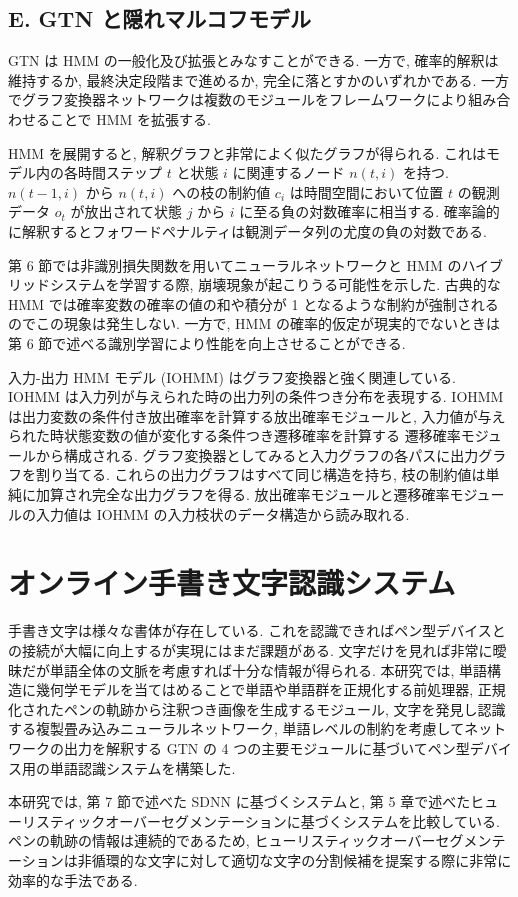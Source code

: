 \documentclass[twocolumn]{jarticle}     %
\begin{document}
\subsection*{E. GTN と隠れマルコフモデル}
GTN は HMM の一般化及び拡張とみなすことができる. 一方で, 確率的解釈は
維持するか, 最終決定段階まで進めるか, 完全に落とすかのいずれかである. 
一方でグラフ変換器ネットワークは複数のモジュールをフレームワークにより組み合わせることで HMM を拡張する.
\par
HMM を展開すると, 解釈グラフと非常によく似たグラフが得られる. これはモデル内の各時間ステップ $t$ と状態 $i$ に関連するノード $n(t,i)$ を持つ.  $n(t-1, i)$ から $n(t, i)$ への枝の制約値 $c_i$ は時間空間において位置 $t$ の観測データ $o_t$ が放出されて状態 $j$ から $i$ に至る負の対数確率に相当する. 確率論的に解釈するとフォワードペナルティは観測データ列の尤度の負の対数である. 
\par
第 6 節では非識別損失関数を用いてニューラルネットワークと HMM のハイブリッドシステムを学習する際, 崩壊現象が起こりうる可能性を示した. 
古典的な HMM では確率変数の確率の値の和や積分が 1 となるような制約が強制されるのでこの現象は発生しない. 
一方で, HMM の確率的仮定が現実的でないときは第 6 節で述べる識別学習により性能を向上させることができる. 
\par
入力-出力 HMM モデル (IOHMM) はグラフ変換器と強く関連している. IOHMM は入力列が与えられた時の出力列の条件つき分布を表現する. 
IOHMM は出力変数の条件付き放出確率を計算する放出確率モジュールと, 入力値が与えられた時状態変数の値が変化する条件つき遷移確率を計算する
遷移確率モジュールから構成される. グラフ変換器としてみると入力グラフの各パスに出力グラフを割り当てる. これらの出力グラフはすべて同じ構造を持ち, 枝の制約値は単純に加算され完全な出力グラフを得る. 放出確率モジュールと遷移確率モジュールの入力値は IOHMM の入力枝状のデータ構造から読み取れる. 

\section{オンライン手書き文字認識システム}
手書き文字は様々な書体が存在している. これを認識できればペン型デバイスとの接続が大幅に向上するが実現にはまだ課題がある. 
文字だけを見れば非常に曖昧だが単語全体の文脈を考慮すれば十分な情報が得られる. 
本研究では, 単語構造に幾何学モデルを当てはめることで単語や単語群を正規化する前処理器, 正規化されたペンの軌跡から注釈つき画像を生成するモジュール, 文字を発見し認識する複製畳み込みニューラルネットワーク, 単語レベルの制約を考慮してネットワークの出力を解釈する GTN の 4 つの主要モジュールに基づいてペン型デバイス用の単語認識システムを構築した. 
\par
本研究では, 第 7 節で述べた SDNN に基づくシステムと, 第 5 章で述べたヒューリスティックオーバーセグメンテーションに基づくシステムを比較している. ペンの軌跡の情報は連続的であるため, ヒューリスティックオーバーセグメンテーションは非循環的な文字に対して適切な文字の分割候補を提案する際に非常に効率的な手法である.
\end{document}
